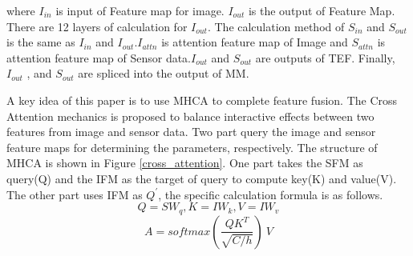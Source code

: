 \documentclass[acmsmall,manuscript, screen, review]{acmart}
\begin{document}
where \begin{math}  I_{in}\end{math} is input of Feature map for image. \begin{math}
  I_{out}
\end{math} is the output of Feature Map. There are 12 layers of calculation for \begin{math}I_{out} \end{math}. The calculation method of \begin{math} S_{in}\end{math} and \begin{math}
  S_{out}
\end{math} is the same as \begin{math}
  I_{in}
\end{math} and \begin{math}
  I_{out}
\end{math}.\begin{math}
  I_{attn}
\end{math} is attention feature map of Image and \begin{math}
  S_{attn}
\end{math} is attention feature map of Sensor data.\begin{math}
  I_{out}
\end{math} and \begin{math}
  S_{out}
\end{math} are outputs of TEF. Finally, \begin{math}
  I_{out}
\end{math} , and \begin{math}
  S_{out}
\end{math} are spliced into the output of MM.

A key idea of this paper is to use MHCA to complete feature fusion. The Cross Attention mechanics is proposed to balance interactive effects between two features from image and sensor data.
Two part query the image and sensor feature maps for determining the parameters, respectively. The structure of MHCA is shown in Figure \ref{cross_attention}. One part takes the SFM as query(Q) and the IFM as the target of query to compute key(K) and value(V). The other part uses IFM as \begin{math}
  Q^\prime
\end{math}, the specific calculation formula is as follows.
\begin{equation}
  Q=SW_q,K=IW_k,V=IW_v
\end{equation}
\begin{equation}
  A=softmax\left(\frac{QK^T}{\sqrt{C/h}}\right)\ V
\end{equation}
\end{document}
